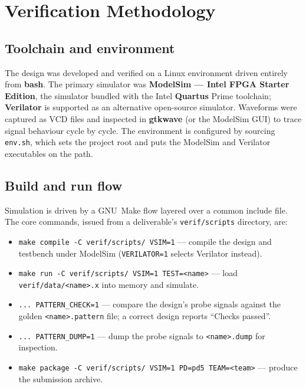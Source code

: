 \documentclass[11pt,a4paper]{article}
\newcommand{\code}[1]{\texttt{#1}}          %
\begin{document}
\section{Verification Methodology}
\label{sec:verif}
\subsection{Toolchain and environment}
The design was developed and verified on a Linux environment driven entirely from
\textbf{bash}. The primary simulator was \textbf{ModelSim --- Intel FPGA Starter Edition},
the simulator bundled with the Intel \textbf{Quartus} Prime toolchain; \textbf{Verilator}
is supported as an alternative open-source simulator. Waveforms were captured as VCD files
and inspected in \textbf{gtkwave} (or the ModelSim GUI) to trace signal behaviour cycle by
cycle. The environment is configured by sourcing \code{env.sh}, which sets the project root
and puts the ModelSim and Verilator executables on the path.

\subsection{Build and run flow}
Simulation is driven by a GNU~Make flow layered over a common include file. The core
commands, issued from a deliverable's \code{verif/scripts} directory, are:

\begin{itemize}[leftmargin=1.4cm]
  \item \code{make compile -C verif/scripts/ VSIM=1} --- compile the design and testbench
    under ModelSim (\code{VERILATOR=1} selects Verilator instead).
  \item \code{make run -C verif/scripts/ VSIM=1 TEST=<name>} --- load
    \code{verif/data/<name>.x} into memory and simulate.
  \item \code{... PATTERN\_CHECK=1} --- compare the design's probe signals against the
    golden \code{<name>.pattern} file; a correct design reports ``Checks passed''.
  \item \code{... PATTERN\_DUMP=1} --- dump the probe signals to \code{<name>.dump} for
    inspection.
  \item \code{make package -C verif/scripts/ VSIM=1 PD=pd5 TEAM=<team>} --- produce the
    submission archive.
\end{itemize}
\end{document}
